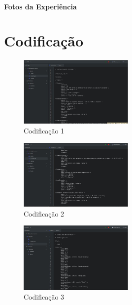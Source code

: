 \documentclass[12pt]{article}
\begin{document}
    \vspace{10mm} 
    \begin{center} 
    \Large 
    \textbf{Fotos da Experiência} 
    \end{center} 

    \vspace{10mm} 
    \setcounter{section}{0}

    \section{Codificação}

    
    \begin{figure}[!ht]
        \centering
        \includegraphics[width=0.5\textwidth]{figures/imagem05.jpeg}
        \caption{Codificação 1}
        \label{fig:imagem5}
    \end{figure}

    \begin{figure}[!ht]
        \centering
        \includegraphics[width=0.5\textwidth]{figures/imagem06.jpeg}
        \caption{Codificação 2}
        \label{fig:imagem6}
    \end{figure}

    \newpage

    \begin{figure}[!ht]
        \centering
        \includegraphics[width=0.5\textwidth]{figures/imagem07.jpeg}
        \caption{Codificação 3}
        \label{fig:imagem7}
    \end{figure}
\end{document}

